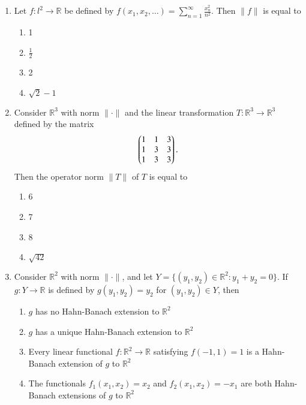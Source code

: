\documentclass[journal]{IEEEtran}
\numberwithin{equation}{enumi}
\numberwithin{figure}{enumi}
\begin{document}
\begin{enumerate}
\item
Let $f: l^2 \to \mathbb{R}$ be defined by $f(x_1,x_2,\ldots) = \sum_{n=1}^\infty \frac{x_n^2}{n^2}$. Then $\| f \|$ is equal to
\hfill{}
\begin{multicols}{4}
\begin{enumerate}
    \item 1
    \item $\frac{1}{2}$
    \item 2
    \item $\sqrt{2} - 1$
\end{enumerate}
\end{multicols}

\item
Consider $\mathbb{R}^3$ with norm $\|\cdot\|$ and the linear transformation $T : \mathbb{R}^3 \to \mathbb{R}^3$ defined by the matrix
\[
\begin{pmatrix}1 & 1 & 3 \\ 1 & 3 & 3 \\ 1 & 3 & 3\end{pmatrix}.
\]
Then the operator norm $\|T\|$ of $T$ is equal to
\hfill{}
\begin{multicols}{4}
\begin{enumerate}
    \item 6
    \item 7
    \item 8
    \item $\sqrt{42}$
\end{enumerate}
\end{multicols}

\item
Consider $\mathbb{R}^2$ with norm $\|\cdot\|$, and let $Y = \{(y_1,y_2) \in \mathbb{R}^2 : y_1 + y_2 = 0\}$. If $g : Y \to \mathbb{R}$ is defined by $g(y_1,y_2) = y_2$ for $(y_1,y_2) \in Y$, then
\hfill{}

\begin{enumerate}
    \item $g$ has no Hahn-Banach extension to $\mathbb{R}^2$
    \item $g$ has a unique Hahn-Banach extension to $\mathbb{R}^2$
    \item Every linear functional $f : \mathbb{R}^2 \to \mathbb{R}$ satisfying $f(-1,1) = 1$ is a Hahn-Banach extension of $g$ to $\mathbb{R}^2$
    \item The functionals $f_1(x_1,x_2) = x_2$ and $f_2(x_1,x_2) = -x_1$ are both Hahn-Banach extensions of $g$ to $\mathbb{R}^2$
\end{enumerate}



\end{enumerate}
\end{document}
